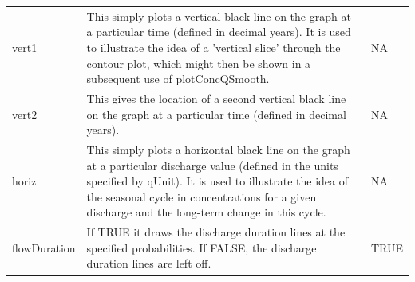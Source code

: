 \documentclass[a4paper,11pt]{article}\usepackage[]{graphicx}\usepackage[]{color}
\begin{document}
\begin{table}[ht]
\begin{tabularx}{\textwidth}{lXl}
vert1 & This simply plots a vertical black line on the graph at a particular time (defined in decimal years).  It is used to illustrate the idea of a 'vertical slice' through the contour plot, which might then be shown in a subsequent use of plotConcQSmooth. & NA  \\
vert2 & This gives the location of a second vertical black line on the graph at a particular time (defined in decimal years). & NA\\
horiz & This simply plots a horizontal black line on the graph at a particular discharge value (defined in the units specified by qUnit).  It is used to illustrate the idea of the seasonal cycle in concentrations for a given discharge and the long-term change in this cycle.  & NA\\
flowDuration & If TRUE it draws the discharge duration lines at the specified probabilities.  If FALSE, the discharge duration lines are left off. & TRUE\\
\hline
\end{tabularx}

\end{table}
\end{document}
